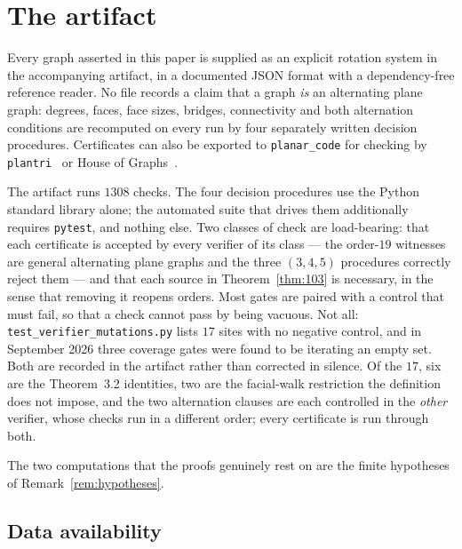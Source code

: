 \documentclass[11pt,a4paper]{amsart}
\theoremstyle{plain}
\theoremstyle{definition}
\begin{document}
\section{The artifact}\label{sec:artifact}

Every graph asserted in this paper is supplied as an explicit rotation system in
the accompanying artifact, in a documented JSON format with a dependency-free
reference reader. No file records a claim that a graph \emph{is} an alternating
plane graph: degrees, faces, face sizes, bridges, connectivity and both
alternation conditions are recomputed on every run by four separately written
decision procedures. Certificates can also be exported to \texttt{planar\_code}
for checking by \texttt{plantri}~\cite{plantri} or House of Graphs~\cite{HoG}.

The artifact runs $1308$ checks. The four decision procedures use the Python
standard library alone; the automated suite that drives them additionally
requires \texttt{pytest}, and nothing else. Two classes of check are load-bearing:
that each certificate is accepted by every verifier of its class --- the
order-$19$ witnesses are general alternating plane graphs and the three
$(3,4,5)$ procedures correctly reject them --- and that each source in
Theorem~\ref{thm:103} is necessary, in the sense that removing it reopens
orders. Most gates are paired with a control that must fail, so that a check
cannot pass by being vacuous. Not all: \texttt{test\_verifier\_mutations.py}
lists $17$ sites with no negative control, and in September 2026 three coverage
gates were found to be iterating an empty set. Both are recorded in the artifact
rather than corrected in silence. Of the $17$, six are the Theorem~3.2
identities, two are the facial-walk restriction the definition does not impose,
and the two alternation clauses are each controlled in the \emph{other}
verifier, whose checks run in a different order; every certificate is run
through both.

The two computations that the proofs genuinely rest on are the finite hypotheses
of Remark~\ref{rem:hypotheses}.

\subsection*{Data availability}
\end{document}
